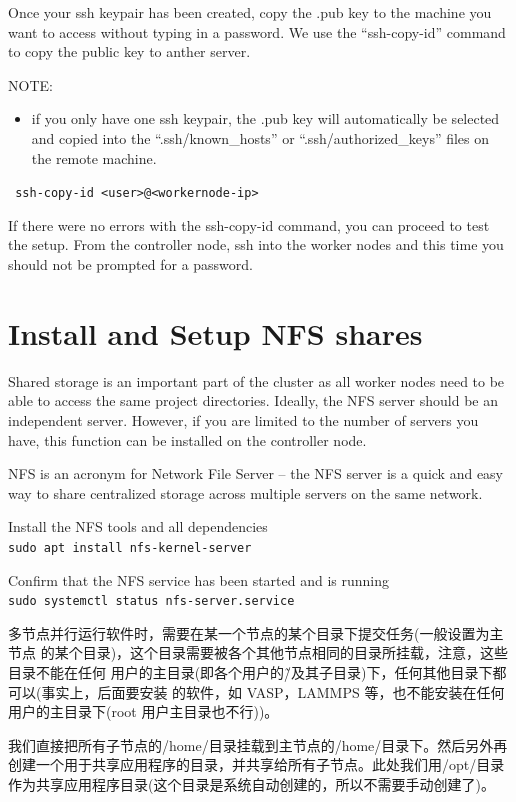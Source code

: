 {Once your ssh keypair has been created, copy the .pub key to the machine you want to access
without typing in a password. We use the “ssh-copy-id” command to copy the public key to anther
server.

NOTE:
\begin{itemize}
\item if you only have one ssh keypair, the .pub key will automatically be selected and copied into
the “.ssh/known\_hosts” or “.ssh/authorized\_keys” files on the remote machine.
\end{itemize}
\verb| ssh-copy-id <user>@<workernode-ip>|

If there were no errors with the ssh-copy-id command, you can proceed to test the setup. From the
controller node, ssh into the worker nodes and this time you should not be prompted for a
password.


\section{Install and Setup NFS shares}
Shared storage is an important part of the cluster as all worker nodes need to be able to access the
same project directories. Ideally, the NFS server should be an independent server. However, if you
are limited to the number of servers you have, this function can be installed on the controller node.

NFS is an acronym for Network File Server – the NFS server is a quick and easy way to share
centralized storage across multiple servers on the same network.

Install the NFS tools and all dependencies\\
\verb|sudo apt install nfs-kernel-server|

Confirm that the NFS service has been started and is running\\
\verb|sudo systemctl status nfs-server.service|

多节点并行运行软件时，需要在某一个节点的某个目录下提交任务(一般设置为主节点
的某个目录)，这个目录需要被各个其他节点相同的目录所挂载，注意，这些目录不能在任何
用户的主目录(即各个用户的\~/及其子目录)下，任何其他目录下都可以(事实上，后面要安装
的软件，如 VASP，LAMMPS 等，也不能安装在任何用户的主目录下(root 用户主目录也不行))。

我们直接把所有子节点的/home/目录挂载到主节点的/home/目录下。然后另外再创建一个用于共享应用程序的目录，并共享给所有子节点。此处我们用/opt/目录作为共享应用程序目录(这个目录是系统自动创建的，所以不需要手动创建了)。

}
